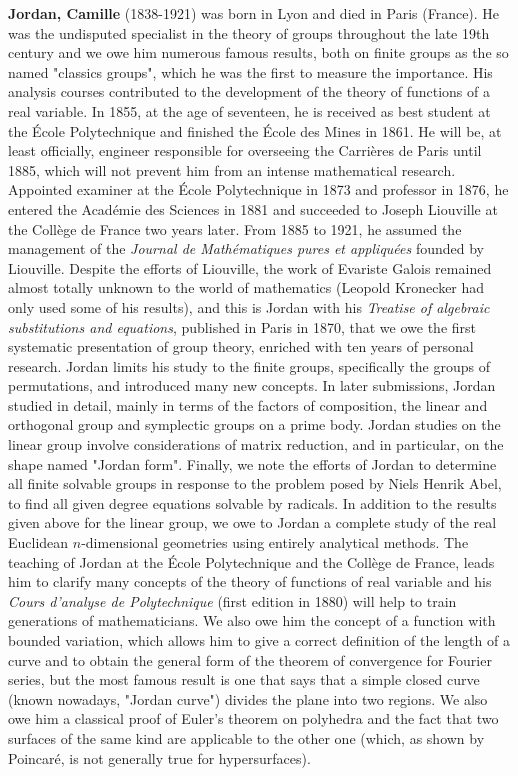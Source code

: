 \textbf{Jordan, Camille} (1838-1921) was born in Lyon and died in Paris (France). He was the undisputed specialist in the theory of groups throughout the late 19th century and we owe him numerous famous results, both on finite groups as the so named "classics groups", which he was the first to measure the importance. His analysis courses contributed to the development of the theory of functions of a real variable. In 1855, at the age of seventeen, he is received as best student at the École Polytechnique and finished the École des Mines in 1861. He will be, at least officially, engineer responsible for overseeing the Carrières de Paris until 1885, which will not prevent him from an intense mathematical research. Appointed examiner at the École Polytechnique in 1873 and professor in 1876, he entered the Académie des Sciences in 1881 and succeeded to Joseph Liouville at the Collège de France two years later. From 1885 to 1921, he assumed the management of the \textit{Journal de Mathématiques pures et appliquées} founded by Liouville. Despite the efforts of Liouville, the work of Evariste Galois remained almost totally unknown to the world of mathematics (Leopold Kronecker had only used some of his results), and this is Jordan with his \textit{Treatise of algebraic substitutions and equations}, published in Paris in 1870, that we owe the first systematic presentation of group theory, enriched with ten years of personal research. Jordan limits his study to the finite groups, specifically the groups of permutations, and introduced many new concepts. In later submissions, Jordan studied in detail, mainly in terms of the factors of composition, the linear and orthogonal group and symplectic groups on a prime body. Jordan studies on the linear group involve considerations of matrix reduction, and in particular, on the shape named "Jordan form". Finally, we note the efforts of Jordan to determine all finite solvable groups in response to the problem posed by Niels Henrik Abel, to find all given degree equations solvable by radicals. In addition to the results given above for the linear group, we owe to Jordan a complete study of the real Euclidean $n$-dimensional geometries using entirely analytical methods. The teaching of Jordan at the École Polytechnique and the Collège de France, leads him to clarify many concepts of the theory of functions of real variable and his \textit{Cours d'analyse de Polytechnique} (first edition in 1880) will help to train generations of mathematicians. We also owe him the concept of a function with bounded variation, which allows him to give a correct definition of the length of a curve and to obtain the general form of the theorem of convergence for Fourier series, but the most famous result is one that says that a simple closed curve (known nowadays, "Jordan curve") divides the plane into two regions.  We also owe him a classical proof of Euler's theorem on polyhedra and the fact that two surfaces of the same kind are applicable to the other one (which, as shown by Poincaré, is not generally true for hypersurfaces).

